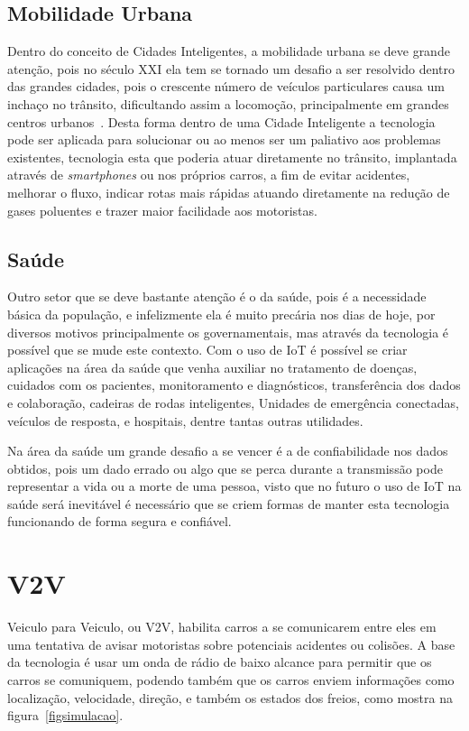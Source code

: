 \subsection{Mobilidade Urbana}
\label{subsec:mobilidadeurbana}
Dentro do conceito de Cidades Inteligentes, a mobilidade urbana se deve grande atenção, pois no século XXI ela tem se tornado um desafio a ser resolvido dentro das grandes cidades, pois o crescente número de veículos particulares causa um inchaço no trânsito, dificultando assim a locomoção, principalmente em grandes centros urbanos~\cite{gonccalomodelo}. Desta forma dentro de uma Cidade Inteligente a tecnologia pode ser aplicada para solucionar ou ao menos ser um paliativo aos problemas existentes, tecnologia esta que poderia atuar diretamente no trânsito, implantada através de \textit{smartphones} ou nos próprios carros, a fim de evitar acidentes, melhorar o fluxo, indicar rotas mais rápidas atuando diretamente na redução de gases poluentes e trazer maior facilidade aos motoristas.~\cite{gonccalomodelo}

\subsection{Saúde}
\label{subsec:saude}
Outro setor que se deve bastante atenção é o da saúde, pois é a necessidade básica da população, e infelizmente ela é muito precária nos dias de hoje, por diversos motivos principalmente os governamentais, mas através da tecnologia é possível que se mude este contexto. Com o uso de IoT é possível se criar aplicações na área da saúde que venha auxiliar no tratamento de doenças, cuidados com os pacientes, monitoramento e diagnósticos, transferência dos dados e colaboração, cadeiras de rodas inteligentes, Unidades de emergência conectadas, veículos de resposta, e hospitais, dentre tantas outras utilidades.~\cite{convergenciadigital}

Na área da saúde um grande desafio a se vencer é a de confiabilidade nos dados obtidos, pois um dado errado ou algo que se perca durante a transmissão pode representar a vida ou a morte de uma pessoa, visto que no futuro o uso de IoT na saúde será inevitável é necessário que se criem formas de manter esta tecnologia funcionando de forma segura e confiável.~\cite{convergenciadigital}

\section{V2V}
\label{sec:v2v}
Veiculo para Veiculo, ou V2V, habilita carros a se comunicarem entre eles em uma tentativa de avisar motoristas sobre potenciais acidentes ou colisões. A base da tecnologia é usar um onda de rádio de baixo alcance para permitir que os carros se comuniquem, podendo também que os carros enviem informações como localização, velocidade, direção, e também os estados dos freios, como mostra na figura~\ref{figsimulacao}.



